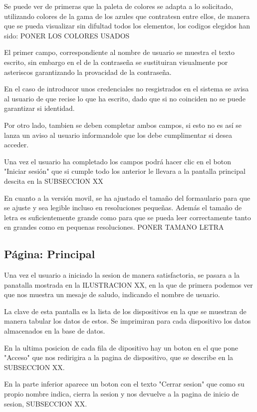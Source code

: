 Se puede ver de primeras que la paleta de colores se adapta a lo solicitado, utilizando colores de la gama de los azules que contratesn entre ellos, de manera que se pueda visualizar sin difultad todos los elementos, los codigos elegidos han sido:
PONER LOS COLORES USADOS

El primer campo, correspondiente al nombre de usuario se muestra el texto escrito, sin embargo en el de la contraseña se sustituiran visualmente por asteriscos garantizando la provacidad de la contraseña.

En el caso de introducor unos credenciales no resgistrados en el sistema se avisa al usuario de que recise lo que ha escrito, dado que si no coinciden no se puede garantizar si identidad.

Por otro lado, tambien se deben completar ambos campos, si esto no es así se lanza un aviso al usuario informandole que los debe cumplimentar si desea acceder.

Una vez el usuario ha completado los campos podrá hacer clic en el boton "Iniciar sesión" que si cumple todo los anterior le llevara a la pantalla principal descita en la SUBSECCION XX

En cuanto a la versión movil, se ha ajustado el tamaño del formaulario para que se ajuste y sea legible incluso en resoluciones pequeñas. Además el tamaño de letra es suficientemente grande como para que se pueda leer correctamente tanto en grandes como en pequenas resoluciones. PONER TAMANO LETRA

\subsection{Página: Principal}
Una vez el usuario a iniciado la sesion de manera satisfactoria, se pasara a la panatalla mostrada en la ILUSTRACION XX, en la que de primera podemos ver que nos muestra un mesaje de saludo, indicando el nombre de usuario.

La clave de esta pantalla es la lista de los dispositivos en la que se muestran de manera tabular los datos de estos. Se imprimiran para cada dispositivo los datos almacenados en la base de datos.

En la ultima posicion de cada fila de dipositivo hay un boton en el que pone "Acceso" que nos redirigira a la pagina de dispositivo, que se describe en la SUBSECCION XX.

En la parte inferior aparece un boton con el texto "Cerrar sesion" que como su propio nombre indica, cierra la sesion y nos devuelve a la pagina de inicio de sesion, SUBSECCION XX.

